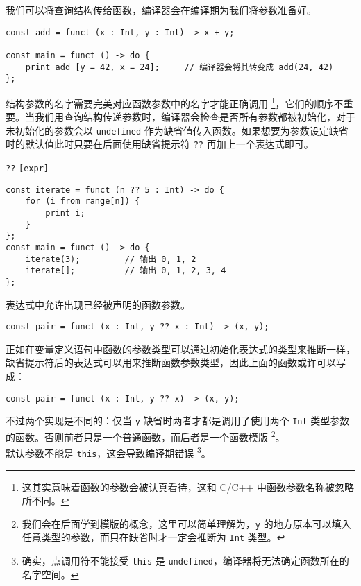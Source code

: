 我们可以将查询结构传给函数，编译器会在编译期为我们将参数准备好。

\begin{lstlisting}
const add = funct (x : Int, y : Int) -> x + y;

const main = funct () -> do {
    print add [y = 42, x = 24];     // 编译器会将其转变成 add(24, 42)
};
\end{lstlisting}

结构参数的名字需要完美对应函数参数中的名字才能正确调用 \footnote{这其实意味着函数的参数会被认真看待，这和 C/C++ 中函数参数名称被忽略所不同。}，它们的顺序不重要。当我们用查询结构传递参数时，编译器会检查是否所有参数都被初始化，对于未初始化的参数会以 \lstinline!undefined! 作为缺省值传入函数。如果想要为参数设定缺省时的默认值此时只要在后面使用缺省提示符 \lstinline|??| 再加上一个表达式即可。

\begin{grammar} \label{grm:default-declaration}
	\lstinline!??! \texttt{[expr]}
\end{grammar}

\begin{lstlisting}
const iterate = funct (n ?? 5 : Int) -> do {
    for (i from range[n]) {
        print i;
    }
};
const main = funct () -> do {
    iterate(3);         // 输出 0, 1, 2
    iterate[];          // 输出 0, 1, 2, 3, 4
};
\end{lstlisting}

表达式中允许出现已经被声明的函数参数。

\begin{lstlisting}
const pair = funct (x : Int, y ?? x : Int) -> (x, y);
\end{lstlisting}

正如在变量定义语句中函数的参数类型可以通过初始化表达式的类型来推断一样，缺省提示符后的表达式可以用来推断函数参数类型，因此上面的函数或许可以写成：

\begin{lstlisting}
const pair = funct (x : Int, y ?? x) -> (x, y);
\end{lstlisting}

不过两个实现是不同的：仅当 \lstinline!y! 缺省时两者才都是调用了使用两个 \lstinline!Int! 类型参数的函数。否则前者只是一个普通函数，而后者是一个函数模版 \footnote{我们会在后面学到模版的概念，这里可以简单理解为，\lstinline!y! 的地方原本可以填入任意类型的参数，而只在缺省时才一定会推断为 \lstinline!Int! 类型。}。 \\

默认参数不能是 \lstinline!this!，这会导致编译期错误 \footnote{确实，点调用符不能接受 \lstinline!this! 是 \lstinline!undefined!，编译器将无法确定函数所在的名字空间。}。 \\

